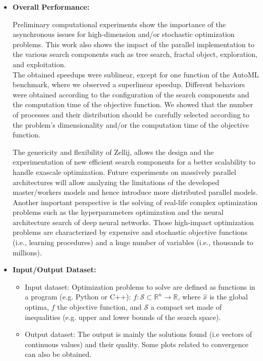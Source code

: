 \begin{itemize}
\item \textbf{Overall Performance:}

Preliminary computational experiments show the importance of the asynchronous issues for high-dimension and/or stochastic optimization problems. This work also shows the impact of the parallel implementation to the various search components such as tree search, fractal object, exploration, and exploitation. \\

The obtained speedups were sublinear, except for one function of the AutoML benchmark, where we observed a superlinear speedup. Different behaviors were obtained according to the configuration of the search components and the computation time of the objective function. We showed
that the number of processes and their distribution should be carefully selected according to the problem’s dimensionality and/or the computation time of the objective function.

The genericity and flexibility of Zellij, allows the design and the experimentation of new efficient search components for a better scalability to handle exascale optimization. Future experiments on massively parallel architectures will allow analyzing the limitations of the developed master/workers models and hence introduce more distributed parallel models. \\

Another important perspective is the solving of real-life complex optimization problems such as the hyperparameters optimization and the neural architecture search of deep neural networks. Those high-impact optimization problems are characterized by expensive and stochastic objective functions
(i.e., learning procedures) and a huge number of variables (i.e., thousands to millions).

\item \textbf{Input/Output Dataset:} 
\begin{itemize}
\item Input dataset: Optimization problems to solve are defined as functions in a program (e.g. Python or C++): ${f: \mathcal{S} \subset \mathbb{R}^n \rightarrow \mathbb{R}}$, where $\hat{x}$ is the global optima, $f$ the objective function, and $\mathcal{S}$ a compact set made of inequalities (e.g. upper and lower bounds of the search space). 

\item Output dataset: The output is mainly the solutions found (i.e vectors of continuous values) and their quality. Some plots related to convergence can also be obtained.


\end{itemize}
\end{itemize}
